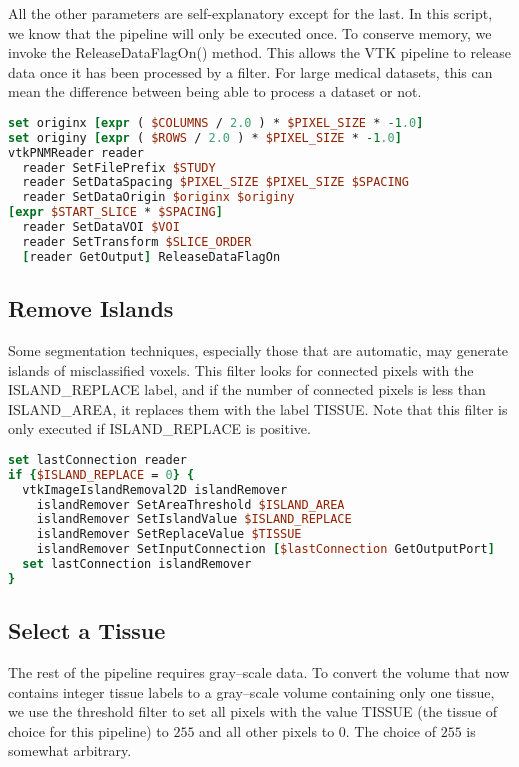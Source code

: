 All the other parameters are self-explanatory except for the last. In this script, we know that the pipeline will only be executed once. To conserve memory, we invoke the ReleaseDataFlagOn() method. This allows the VTK pipeline to release data once it has been processed by a filter. For large medical datasets, this can mean the difference between being able to process a dataset or not.

\begin{lstlisting}[language=TCL, caption={Read the Segmented Volume Data.}]
set originx [expr ( $COLUMNS / 2.0 ) * $PIXEL_SIZE * -1.0]
set originy [expr ( $ROWS / 2.0 ) * $PIXEL_SIZE * -1.0]
vtkPNMReader reader
  reader SetFilePrefix $STUDY
  reader SetDataSpacing $PIXEL_SIZE $PIXEL_SIZE $SPACING
  reader SetDataOrigin $originx $originy
[expr $START_SLICE * $SPACING]
  reader SetDataVOI $VOI
  reader SetTransform $SLICE_ORDER
  [reader GetOutput] ReleaseDataFlagOn
\end{lstlisting}

\subsection{Remove Islands}

Some segmentation techniques, especially those that are automatic, may generate islands of misclassified voxels. This filter looks for connected pixels with the ISLAND\_REPLACE label, and if the number of connected pixels is less than ISLAND\_AREA, it replaces them with the label TISSUE. Note that this filter is only executed if ISLAND\_REPLACE is positive.

\begin{lstlisting}[language=TCL, caption={Remove Islands.}]
set lastConnection reader
if {$ISLAND_REPLACE = 0} {
  vtkImageIslandRemoval2D islandRemover
    islandRemover SetAreaThreshold $ISLAND_AREA
    islandRemover SetIslandValue $ISLAND_REPLACE
    islandRemover SetReplaceValue $TISSUE
    islandRemover SetInputConnection [$lastConnection GetOutputPort]
  set lastConnection islandRemover
}
\end{lstlisting}

\subsection{Select a Tissue}

The rest of the pipeline requires gray--scale data. To convert the volume that now contains integer tissue labels to a gray--scale volume containing only one tissue, we use the threshold filter to set all pixels with the value TISSUE (the tissue of choice for this pipeline) to $255$ and all other pixels to $0$. The choice of $255$ is somewhat arbitrary.

